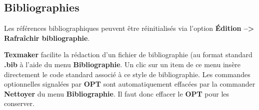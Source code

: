 \documentclass[a4paper,11pt]{article}
\begin{document}
\subsection*{Bibliographies}
Les références bibliographiques peuvent être réinitialisés via l'option \textbf{Édition --> Rafraîchir bibliographie}.

\textbf{Texmaker} facilite la rédaction d'un fichier de bibliographie (au format standard \textbf{.bib} à l'aide du menu \textbf{Bibliographie}. Un clic sur un item de ce menu insère directement le code standard associé à ce style de bibliographie. Les commandes optionnelles signalées par \textbf{OPT} sont automatiquement effacées par la commander \textbf{Nettoyer} du menu \textbf{Bibliographie}. Il faut donc effacer le \textbf{OPT} pour les conserver.
\end{document}
